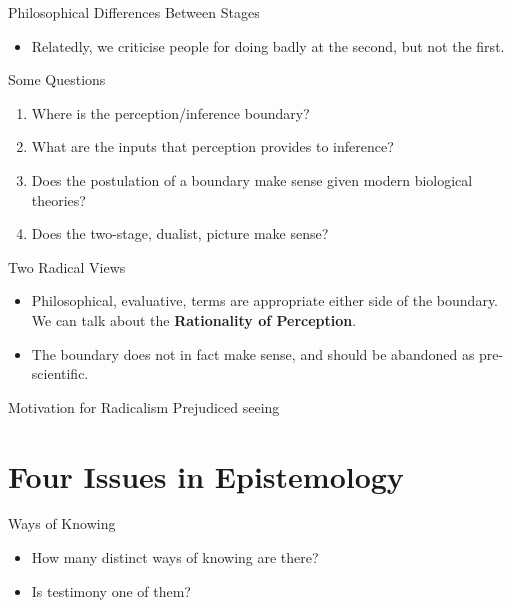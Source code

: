 \documentclass[
  17pt,
  letterpaper,
  ignorenonframetext,
  aspectratio=169,
  handout]{beamer}
\providecommand{\tightlist}{%
  \setlength{\itemsep}{0pt}\setlength{\parskip}{0pt}}\usepackage{longtable,booktabs,array}
\begin{document}
\begin{frame}{Philosophical Differences Between Stages}
\protect\hypertarget{philosophical-differences-between-stages-2}{}
\begin{itemize}[<+->]
\tightlist
\item
  Relatedly, we criticise people for doing badly at the second, but not
  the first.
\end{itemize}
\end{frame}

\begin{frame}{Some Questions}
\protect\hypertarget{some-questions}{}
\begin{enumerate}[<+->]
\tightlist
\item
  Where is the perception/inference boundary?
\item
  What are the inputs that perception provides to inference?
\item
  Does the postulation of a boundary make sense given modern biological
  theories?
\item
  Does the two-stage, dualist, picture make sense?
\end{enumerate}
\end{frame}

\begin{frame}{Two Radical Views}
\protect\hypertarget{two-radical-views}{}
\begin{itemize}[<+->]
\tightlist
\item
  Philosophical, evaluative, terms are appropriate either side of the
  boundary. We can talk about the \textbf{Rationality of Perception}.
\item
  The boundary does not in fact make sense, and should be abandoned as
  pre-scientific.
\end{itemize}
\end{frame}

\begin{frame}{Motivation for Radicalism}
\protect\hypertarget{motivation-for-radicalism}{}
Prejudiced seeing
\end{frame}

\hypertarget{four-issues-in-epistemology}{%
\section{Four Issues in
Epistemology}\label{four-issues-in-epistemology}}

\begin{frame}{Ways of Knowing}
\protect\hypertarget{ways-of-knowing}{}
\begin{itemize}[<+->]
\tightlist
\item
  How many distinct ways of knowing are there?
\item
  Is testimony one of them?
\end{itemize}
\end{frame}
\end{document}
